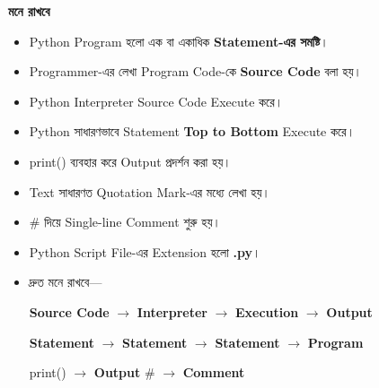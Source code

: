 \begin{rememberbox}

\textbf{\color{deepOrange}মনে রাখবে}

\begin{itemize}

\item
Python Program হলো এক বা একাধিক
\textbf{Statement-এর সমষ্টি}।

\item
Programmer-এর লেখা Program Code-কে
\textbf{Source Code}
বলা হয়।

\item
Python Interpreter Source Code Execute করে।

\item
Python সাধারণভাবে Statement
\textbf{Top to Bottom}
Execute করে।

\item
\textenglish{\ttfamily print()}
ব্যবহার করে Output প্রদর্শন করা হয়।

\item
Text সাধারণত Quotation Mark-এর মধ্যে লেখা হয়।

\item
\textenglish{\ttfamily \#}
দিয়ে Single-line Comment শুরু হয়।

\item
Python Script File-এর Extension হলো
\textbf{\textenglish{\ttfamily .py}}।

\item
দ্রুত মনে রাখবে—

\begin{center}

\textbf{Source Code}
\(\longrightarrow\)
\textbf{Interpreter}
\(\longrightarrow\)
\textbf{Execution}
\(\longrightarrow\)
\textbf{Output}

\medskip

\textbf{Statement}
\(\longrightarrow\)
\textbf{Statement}
\(\longrightarrow\)
\textbf{Statement}
\(\longrightarrow\)
\textbf{Program}

\medskip

\textenglish{\ttfamily print()}
\(\longrightarrow\)
\textbf{Output}
\qquad
\textenglish{\ttfamily \#}
\(\longrightarrow\)
\textbf{Comment}

\end{center}

\end{itemize}

\end{rememberbox}

\small


